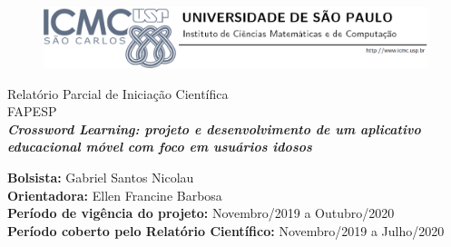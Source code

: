 \begin{titlepage}

\begin{center}
	\begin{figure}[!ht]
	\centering
	\includegraphics[scale=0.5]{Figuras/logo.png}
	\end{figure}
	\vspace{60pt}
	\begin{minipage}[c]{13.5cm}
			\begin{center}
			\vspace{1.3cm} {\Large\sf Relatório Parcial de Iniciação Científica}\\
			\vspace{0.3cm} {\Large\sf FAPESP}\\
			\vspace{5cm}
			\textbf{\Large\sf\textit{Crossword Learning: projeto e desenvolvimento de um
aplicativo educacional móvel com foco em usuários
idosos}}\\
			\vspace{1.3cm}
			\end{center}
		\end{minipage}
\vfill
\begin{minipage}[c]{13.5cm}
	\begin{center}
		\sffamily\textbf{Bolsista:} Gabriel Santos Nicolau\\
		\sffamily\textbf{Orientadora:} Ellen Francine Barbosa\\
		\sffamily\textbf{Período de vigência do projeto:} Novembro/2019 a Outubro/2020\\
		\sffamily\textbf{Período coberto pelo Relatório Científico:} Novembro/2019 a Julho/2020\\
	\end{center}
\end{minipage}
\end{center}
\cleardoublepage
\end{titlepage}
